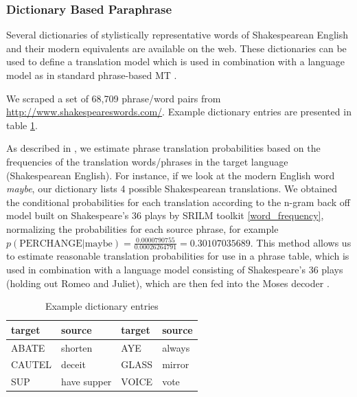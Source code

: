 \documentclass[10pt,a5paper,twoside]{article}
\begin{document}
\subsubsection{Dictionary Based Paraphrase}
\label{dictionary_baseline}
Several dictionaries of stylistically representative words of Shakespearean English and their modern equivalents are available on the web.  These dictionaries can be used 
to define a translation model which is used in combination with a language model as in standard phrase-based MT \cite{Koehn00}.


We scraped a set of 68,709 phrase/word pairs from \url{http://www.shakespeareswords.com/}.  
Example dictionary entries are presented in table \ref{dictionary_example}. 

As described in \cite{Koehn00}, we estimate phrase translation probabilities based on the frequencies of the translation words/phrases in the target language (Shakespearean English).
For instance, if we look at the modern English word \emph{maybe}, our dictionary lists 4 possible Shakespearean translations. 
We obtained the conditional probabilities for each translation according to the n-gram back off model built on Shakespeare's 
36 plays by SRILM toolkit \cite{Stolcke02} \ref{word_frequency}, 
normalizing the probabilities for each source phrase, for example $p(\text{PERCHANGE}|\text{maybe}) = \frac{0.0000790755}{0.00026264791} = 0.30107035689$. 
This method allows us to estimate reasonable translation probabilities for use in a phrase table, which is used in combination 
with a language model consisting of Shakespeare's 36 plays (holding out Romeo and Juliet), which are then fed into the Moses decoder
\cite{Koehn07}.

\begin{table}
  \begin{center}
  \begin{tabular}{|l|l||l|l|}
    \hline
    target & source & target & source \\
    \hline
    \hline
    ABATE & shorten & AYE & always \\
    \hline
    CAUTEL & deceit & GLASS & mirror \\
    \hline
    SUP & have supper & VOICE & vote \\
    \hline
  \end{tabular}
  \end{center}
  \caption{Example dictionary entries}
  \label{dictionary_example}
\end{table}
\end{document}
